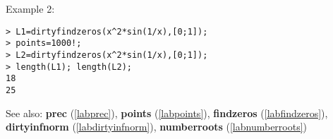 \noindent Example 2: 
\begin{center}\begin{minipage}{15cm}\begin{Verbatim}[frame=single]
> L1=dirtyfindzeros(x^2*sin(1/x),[0;1]);
> points=1000!;
> L2=dirtyfindzeros(x^2*sin(1/x),[0;1]);
> length(L1); length(L2);
18
25
\end{Verbatim}
\end{minipage}\end{center}
See also: \textbf{prec} (\ref{labprec}), \textbf{points} (\ref{labpoints}), \textbf{findzeros} (\ref{labfindzeros}), \textbf{dirtyinfnorm} (\ref{labdirtyinfnorm}), \textbf{numberroots} (\ref{labnumberroots})
